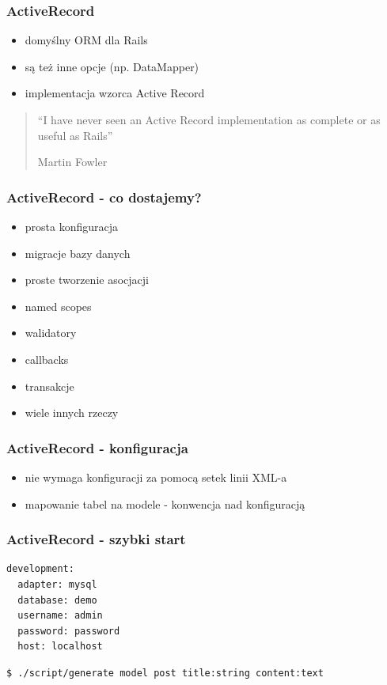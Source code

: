 \documentclass[12t]{beamer}
\begin{document}
\begin{frame}
  \frametitle{ActiveRecord}
  \begin{itemize}
  \item domyślny ORM dla Rails
  \item są też inne opcje (np. DataMapper)
  \item implementacja wzorca Active Record
  \end{itemize}
\end{frame}

\begin{frame}
  \begin{quote}
    “I have never seen an Active Record implementation as complete or as useful as Rails”

    \hfill Martin Fowler
  \end{quote}
\end{frame}

\begin{frame}
  \frametitle{ActiveRecord - co dostajemy?}
  \begin{itemize}
  \item prosta konfiguracja
  \item migracje bazy danych
  \item proste tworzenie asocjacji
  \item named scopes
  \item walidatory
  \item callbacks
  \item transakcje
  \item wiele innych rzeczy
  \end{itemize}
\end{frame}

\begin{frame}
  \frametitle{ActiveRecord - konfiguracja}
  \begin{itemize}
  \item nie wymaga konfiguracji za pomocą setek linii XML-a
  \item mapowanie tabel na modele - konwencja nad konfiguracją
  \end{itemize}
\end{frame}

\begin{frame}[fragile]
  \frametitle{ActiveRecord - szybki start}
\begin{verbatim}
development:
  adapter: mysql
  database: demo
  username: admin
  password: password
  host: localhost
\end{verbatim}
\begin{verbatim}
$ ./script/generate model post title:string content:text
\end{verbatim}
  
\end{frame}
\end{document}
